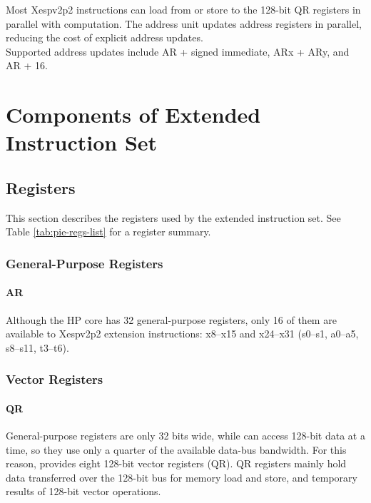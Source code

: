 \documentclass[main\_\_EN.tex]{subfiles}
\begin{document}
Most Xespv2p2 instructions can load from or store to the 128-bit QR registers in parallel with computation. The address unit updates address registers in parallel, reducing the cost of explicit address updates.\\
Supported address updates include AR + signed immediate, ARx + ARy, and AR + 16.


\section{Components of Extended Instruction Set}

\subsection{Registers}

This section describes the registers used by the \chipname{} extended instruction set. 
See Table \ref{tab:pie-regs-list} for a register summary.



\subsubsection{General-Purpose Registers}
\paragraph{AR}


Although the HP core has 32 general-purpose registers, only 16 of them are available to Xespv2p2 extension instructions: x8–x15 and x24–x31 (s0–s1, a0–a5, s8–s11, t3–t6).



\subsubsection{Vector Registers}

\paragraph{QR}

General-purpose registers are only 32 bits wide, while \chipname{} can access 128-bit data at a time, so they use only a quarter of the available data-bus bandwidth. For this reason, \chipname{} provides eight 128-bit vector registers (QR). QR registers mainly hold data transferred over the 128-bit bus for memory load and store, and temporary results of 128-bit vector operations.
\end{document}
